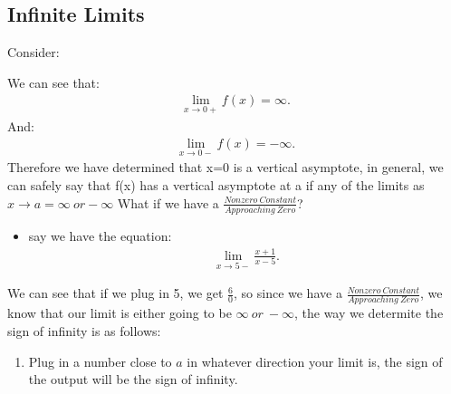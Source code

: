 \documentclass{report}
\begin{document}
    \subsection{Infinite Limits}
      \bigbreak \noindent 
      Consider:
      \begin{figure}[ht]
          \centering
          \label{fig:inf}
      \end{figure}
      \bigbreak \noindent 
      We can see that:
      \begin{align*}
        \lim\limits_{x \to 0+}{f(x) = \infty}
      .\end{align*}
      \bigbreak \noindent 
      And:
      \begin{align*}
        \lim\limits_{x \to 0-}{f(x) = -\infty}
      .\end{align*}
      \bigbreak \noindent 
      Therefore we have determined that x=0 is a vertical asymptote, in general, we can safely say that f(x) has a vertical asymptote at a if any of the limits as $x \rightarrow a  = \infty\ or -\infty$ 
      \bigbreak \noindent
        What if we have a $\frac{Nonzero\ Constant}{Approaching\ Zero} $?
        \bigbreak \noindent 
          \begin{itemize}
            \item say we have the equation:
              \begin{align*}
                \lim\limits_{x \to 5-}{\frac{x+1}{x-5}}
              .\end{align*}
          \end{itemize}
          We can see that if we plug in 5, we get $\frac{6}{0}$, so since we have a $\frac{Nonzero\ Constant}{Approaching\ Zero}$, we know that our limit is either going to be $\infty\ or\ -\infty $, the way we determite the sign of infinity is as follows:
          \begin{enumerate}
            \item Plug in a number close to $a$ in whatever direction your limit is, the sign of the output will be the sign of infinity.
          \end{enumerate}
          \bigbreak \noindent \bigbreak \noindent


      \bigbreak \noindent \bigbreak \noindent 
\end{document}
